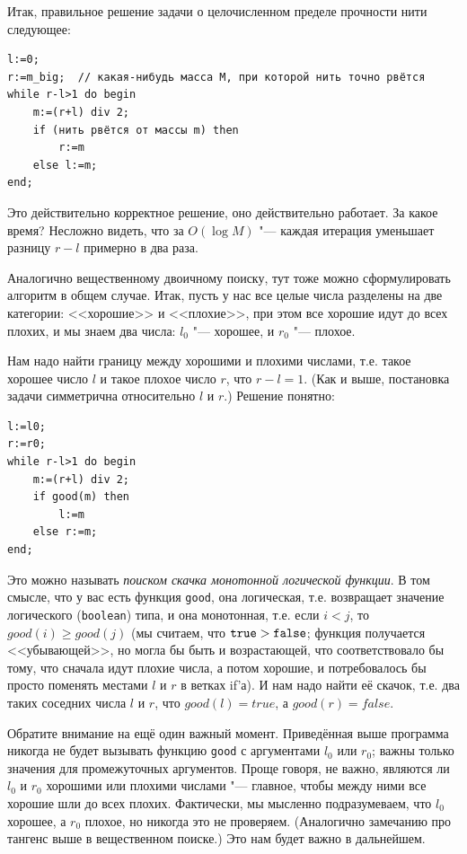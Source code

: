 \documentclass[a4paper,10pt]{problems}
\begin{document}
Итак, правильное решение задачи о целочисленном пределе прочности нити следующее:
\begin{codesampleo}\begin{verbatim}
l:=0;
r:=m_big;  // какая-нибудь масса M, при которой нить точно рвётся
while r-l>1 do begin    
    m:=(r+l) div 2;
    if (нить рвётся от массы m) then
        r:=m
    else l:=m;
end;
\end{verbatim}
\end{codesampleo}

Это действительно корректное решение, оно действительно работает. За какое время? 
Несложно видеть, что за $O(\log M)$ "--- каждая итерация уменьшает разницу $r-l$ примерно в два раза.

 Аналогично вещественному двоичному поиску, тут тоже можно сформулировать алгоритм в общем случае.
Итак, пусть у нас все целые числа разделены на две категории: <<хорошие>> и <<плохие>>, при этом все хорошие идут до всех плохих,
и мы знаем два числа: $l_0$ "--- хорошее, и $r_0$ "--- плохое. 

Нам надо найти границу между хорошими и плохими числами, т.е. такое хорошее число $l$ и такое плохое число $r$, что $r-l=1$. 
(Как и выше, постановка задачи симметрична относительно $l$ и $r$.)
Решение понятно:
\begin{codesampleo}\begin{verbatim}
l:=l0;
r:=r0;  
while r-l>1 do begin    
    m:=(r+l) div 2;
    if good(m) then
        l:=m
    else r:=m;
end;
\end{verbatim}
\end{codesampleo}

Это можно называть \textit{поиском скачка монотонной логической функции}. 
В том смысле, что у вас есть функция \verb`good`, она логическая, 
т.е. возвращает значение логического (\verb`boolean`) типа,
и она монотонная, т.е. если $i<j$, то $good(i)\geq good(j)$ 
(мы считаем, что $\verb`true`>\verb`false`$; функция получается <<убывающей>>,
но могла бы быть и возрастающей, что соответствовало бы тому,
что сначала идут плохие числа, а потом хорошие, и потребовалось бы просто поменять местами $l$ и $r$
в ветках if'а). 
И нам надо найти её скачок, т.е. два таких соседних числа $l$ и $r$, что $good(l)=true$,
а $good(r)=false$.

Обратите внимание на ещё один важный момент. 
Приведённая выше программа никогда не будет вызывать функцию \verb`good`
с аргументами $l_0$ или $r_0$; важны только значения для промежуточных аргументов.
Проще говоря, не важно, являются ли $l_0$ и $r_0$ хорошими или плохими числами
"--- главное, чтобы между ними все хорошие шли до всех плохих. 
Фактически, мы мысленно подразумеваем, что $l_0$ хорошее, а $r_0$ плохое, но
никогда это не проверяем.
(Аналогично замечанию про тангенс выше в вещественном поиске.)
Это нам будет важно в дальнейшем.
\end{document}
